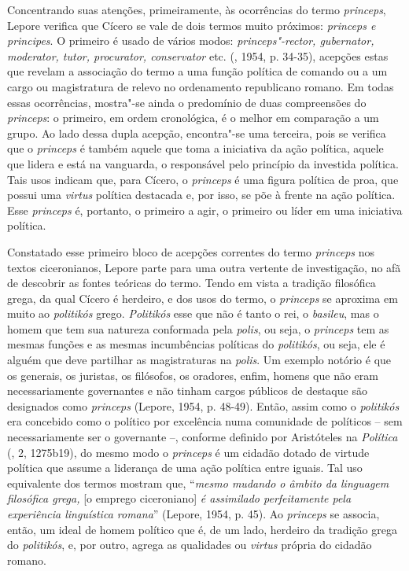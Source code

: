Concentrando suas atenções, primeiramente, às ocorrências do termo
\emph{princeps}, Lepore verifica que Cícero se vale de dois termos muito
próximos: \emph{princeps e principes}. O primeiro é usado de vários
modos: \emph{princeps"-rector, gubernator, moderator, tutor, procurator,
conservator} etc. (, 1954, p. 34-35), acepções estas que revelam a
associação do termo a uma função política de comando ou a um cargo ou
magistratura de relevo no ordenamento republicano romano. Em todas essas
ocorrências, mostra"-se ainda o predomínio de duas compreensões do
\emph{princeps}: o primeiro, em ordem cronológica, é o melhor em
comparação a um grupo. Ao lado dessa dupla acepção, encontra"-se uma
terceira, pois se verifica que o \emph{princeps} é também aquele que
toma a iniciativa da ação política, aquele que lidera e está na
vanguarda, o responsável pelo princípio da investida política. Tais usos
indicam que, para Cícero, o \emph{princeps} é uma figura política de
proa, que possui uma \emph{virtus} política destacada e, por isso, se
põe à frente na ação política. Esse \emph{princeps} é, portanto, o
primeiro a agir, o primeiro ou líder em uma iniciativa política.

Constatado esse primeiro bloco de acepções correntes do termo
\emph{princeps} nos textos ciceronianos, Lepore parte para uma outra
vertente de investigação, no afã de descobrir as fontes teóricas do
termo. Tendo em vista a tradição filosófica grega, da qual Cícero é
herdeiro, e dos usos do termo, o \emph{princeps} se aproxima em muito ao
\emph{politikós} grego. \emph{Politikós} esse que não é tanto o rei, o
\emph{basileu}, mas o homem que tem sua natureza conformada pela
\emph{polis}, ou seja, o \emph{princeps} tem as mesmas funções e as
mesmas incumbências políticas do \emph{politikós}, ou seja, ele é alguém
que deve partilhar as magistraturas na \emph{polis}. Um exemplo notório
é que os generais, os juristas, os filósofos, os oradores, enfim, homens
que não eram necessariamente governantes e não tinham cargos públicos de
destaque são designados como \emph{princeps} (Lepore, 1954, p. 48-49).
Então, assim como o \emph{politikós} era concebido como o político por
excelência numa comunidade de políticos -- sem necessariamente ser o
governante --, conforme definido por Aristóteles na \emph{Política}
(, 2, 1275b19), do mesmo modo o \emph{princeps} é um cidadão dotado
de virtude política que assume a liderança de uma ação política entre
iguais. Tal uso equivalente dos termos mostram que, ``\emph{mesmo
mudando o âmbito da linguagem filosófica grega,} {[}o emprego
ciceroniano{]} \emph{é assimilado perfeitamente pela experiência
linguística romana}'' (Lepore, 1954, p. 45). Ao \emph{princeps} se
associa, então, um ideal de homem político que é, de um lado, herdeiro
da tradição grega do \emph{politikós}, e, por outro, agrega as
qualidades ou \emph{virtus} própria do cidadão romano.

